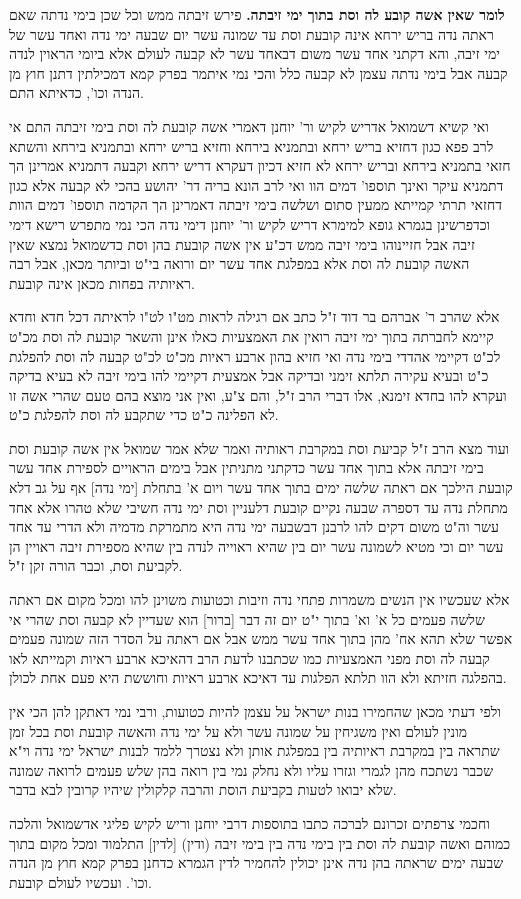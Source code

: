 \documentclass[12pt, openany]{book}
\newcommand{\sethebfont}{
\fontsize{10.5pt}{21.0pt} \selectfont
}
\newcommand{\twocol}[1]{
	{\sethebfont \begin{multicols}{2}
			#1
	\end{multicols}}	
}
\begin{document}
\twocol{\textbf{לומר שאין אשה קובע לה וסת בתוך ימי זיבתה.}  פירש זיבתה ממש וכל שכן בימי נדתה שאם ראתה נדה בריש ירחא אינה קובעת וסת עד שמונה עשר יום שבעה ימי נדה ואחד עשר של ימי זיבה, והא דקתני אחד עשר משום דבאחד עשר לא קבעה לעולם אלא ביומי הראוין לנדה קבעה אבל בימי נדתה עצמן לא קבעה כלל והכי נמי איתמר בפרק קמא דמכילתין דתנן חוץ מן הנדה וכו', כדאיתא התם.\par  ואי קשיא דשמואל אדריש לקיש ור' יוחנן דאמרי אשה קובעת לה וסת בימי זיבתה התם אי לרב פפא כגון דחזיא בריש ירחא ובתמניא בירחא וחזיא בריש ירחא ובתמניא בירחא והשתא חזאי בתמניא בירחא ובריש ירחא לא חזיא דכיון דעקרא דריש ירחא וקבעה דתמניא אמרינן הך דתמניא עיקר ואינך תוספו' דמים הוו ואי לרב הונא בריה דר' יהושע בהכי לא קבעה אלא כגון דחזאי תרתי קמייתא ממעין סתום ושלשה בימי זיבתה דאמרינן הך הקדמה תוספו' דמים הוות וכדפרשינן בגמרא גופא למימרא דריש לקיש ור' יוחנן דימי נדה הכי נמי מתפרש רישא דימי זיבה אבל חזיינוהו בימי זיבה ממש דכ"ע אין אשה קובעת בהן וסת כדשמואל נמצא שאין האשה קובעת לה וסת אלא במפלגת אחד עשר יום ורואה בי"ט וביותר מכאן, אבל רבה ראיותיה בפחות מכאן אינה קובעת.\par אלא שהרב ר' אברהם בר דוד ז"ל כתב אם רגילה לראות מט"ו לט"ו לראיתה דכל חדא וחדא קיימא לחברתה בתוך ימי זיבה רואין את האמצעיות כאלו אינן והשאר קובעת לה וסת מכ"ט לכ"ט דקיימי אהדדי בימי נדה ואי חזיא בהון ארבע ראיות מכ"ט לכ"ט קבעה לה וסת להפלגת כ"ט ובעיא עקירה תלתא זימני ובדיקה אבל אמצעית דקיימי להו בימי זיבה לא בעיא בדיקה ועקרא להו בחדא זימנא, אלו דברי הרב ז"ל, והם צ"ע, ואין אני מוצא בהם טעם שהרי אשה זו לא הפלינה כ"ט כדי שתקבע לה וסת להפלגת כ"ט.\par  ועוד מצא הרב ז"ל קביעת וסת במקרבת ראותיה ואמר שלא אמר שמואל אין אשה קובעת וסת בימי זיבתה אלא בתוך אחד עשר כדקתני מתניתין אבל בימים הראויים לספירת אחד עשר קובעת הילכך אם ראתה שלשה ימים בתוך אחד עשר ויום א' בתחלת [ימי נדה] אף על גב דלא מתחלת נדה עד דספרה שבעה נקיים קובעת דלעניין וסת ימי נדה חשיבי שלא טהרו אלא אחד עשר וה"ט משום דקים להו לרבנן דבשבעה ימי נדה היא מתמרקת מדמיה ולא הדרי עד אחד עשר יום וכי מטיא לשמונה עשר יום בין שהיא ראוייה לנדה בין שהיא מספירת זיבה ראויין הן לקביעת וסת, וכבר הורה זקן ז"ל.\par  אלא שעכשיו אין הנשים משמרות פתחי נדה וזיבות וכטועות משוינן להו ומכל מקום אם ראתה שלשה פעמים כל א' וא' בתוך י"ט יום זה דבר [ברור] הוא שעדיין לא קבעה וסת שהרי אי אפשר שלא תהא אח' מהן בתוך אחד עשר ממש אבל אם ראתה על הסדר הזה שמונה פעמים קבעה לה וסת מפני האמצעיות כמו שכתבנו לדעת הרב דהאיכא ארבע ראיות וקמייתא לאו בהפלגה חזיתא ולא הוו תלתא הפלגות עד דאיכא ארבע ראיות וחוששת היא פעם אחת לכולן.\par ולפי דעתי מכאן שהחמירו בנות ישראל על עצמן להיות כטועות, ורבי נמי דאתקן להן הכי אין מונין לעולם ואין משגיחין על שמונה עשר ולא על ימי נדה והאשה קובעת וסת בכל זמן שתראה בין במקרבת ראיותיה בין במפלגת אותן ולא נצטרך ללמד לבנות ישראל ימי נדה וי"א שכבר נשתכח מהן לגמרי וגזרו עליו ולא נחלק נמי בין רואה בהן שלש פעמים לרואה שמונה שלא יבואו לטעות בקביעת הוסת והרבה קלקולין שיהיו קרובין לבא בדבר.\par  וחכמי צרפתים זכרונם לברכה כתבו בתוספות דרבי יוחנן וריש לקיש פליגי אדשמואל והלכה כמוהם ואשה קובעת לה וסת בין בימי נדה בין בימי זיבה (ודין) [לדין] התלמוד ומכל מקום בתוך שבעה ימים שראתה בהן נדה אינן יכולין להחמיר לדין הגמרא כדחנן בפרק קמא חוץ מן הנדה וכו'. ועכשיו לעולם קובעת. 
}
\end{document}

